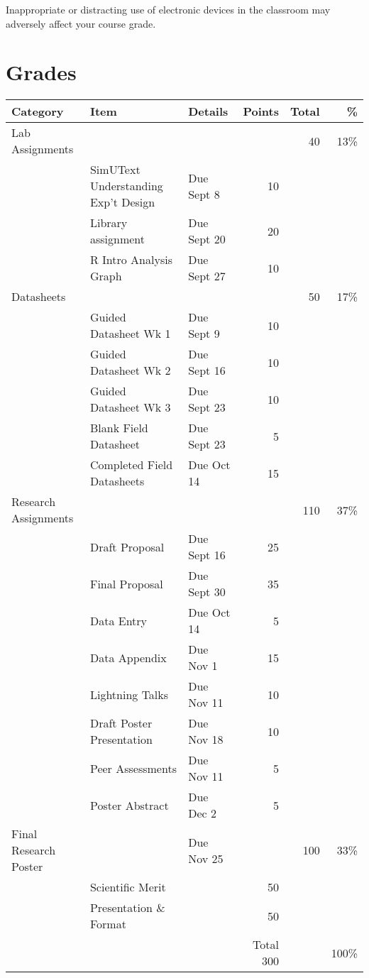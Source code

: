 \documentclass{tufte-handout}
\begin{document}
\begin{fullwidth}
Inappropriate or distracting use of electronic devices in the classroom may adversely affect your course grade. 

\section{Grades}













				

\begin{tabular}{l l l r r r}
Category & Item & Details & Points  & Total & \% \\
\hline
Lab Assignments & & &  & 40 & 13\% \\
& SimUText Understanding Exp't Design & Due Sept 8 &10 \\
& Library assignment & Due Sept 20 & 20 \\
& R Intro Analysis Graph & Due Sept 27 & 10 \\
\hline
Datasheets & & &  & 50 & 17\% \\
& Guided Datasheet Wk 1 & Due Sept 9 & 10 \\
& Guided Datasheet Wk 2 & Due Sept 16 & 10 \\
& Guided Datasheet Wk 3 & Due Sept 23 & 10 \\
& Blank Field Datasheet & Due Sept 23 & 5 \\
& Completed Field Datasheets & Due Oct 14 & 15 \\
\hline
Research Assignments & & & & 110 & 37\% \\
& Draft Proposal & Due Sept 16 & 25 \\
& Final Proposal & Due Sept 30 & 35 \\
& Data Entry & Due Oct 14 & 5 \\
& Data Appendix & Due Nov 1 & 15 \\
& Lightning Talks & Due Nov 11 & 10 \\
& Draft Poster Presentation & Due Nov 18 & 10 \\
& Peer Assessments & Due Nov 11 & 5 \\
& Poster Abstract & Due Dec 2 & 5 \\
\hline
Final Research Poster & & Due Nov 25 & & 100 & 33\% \\
& Scientific Merit &  & 50 \\
&  Presentation \& Format && 50 \\
\hline 
& & & Total 300 & & 100\% \\
\end{tabular}


\end{fullwidth}
\end{document}
